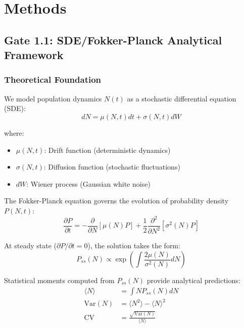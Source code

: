 \documentclass[11pt]{article}
\newcommand{\cv}{\text{CV}}
\newcommand{\var}{\text{Var}}
\begin{document}

\section{Methods}

\subsection{Gate 1.1: SDE/Fokker-Planck Analytical Framework}

\subsubsection{Theoretical Foundation}

We model population dynamics $N(t)$ as a stochastic differential equation (SDE):
\begin{equation}
dN = \mu(N,t)dt + \sigma(N,t)dW
\end{equation}

where:
\begin{itemize}
\item $\mu(N,t)$: Drift function (deterministic dynamics)
\item $\sigma(N,t)$: Diffusion function (stochastic fluctuations)
\item $dW$: Wiener process (Gaussian white noise)
\end{itemize}

The Fokker-Planck equation governs the evolution of probability density $P(N,t)$:
\begin{equation}
\frac{\partial P}{\partial t} = -\frac{\partial}{\partial N}[\mu(N)P] + \frac{1}{2}\frac{\partial^2}{\partial N^2}[\sigma^2(N)P]
\end{equation}

At steady state ($\partial P/\partial t = 0$), the solution takes the form:
\begin{equation}
P_{ss}(N) \propto \exp\left(\int \frac{2\mu(N)}{\sigma^2(N)}dN\right)
\end{equation}

Statistical moments computed from $P_{ss}(N)$ provide analytical predictions:
\begin{align}
\langle N \rangle &= \int N P_{ss}(N) dN \\
\var(N) &= \langle N^2 \rangle - \langle N \rangle^2 \\
\cv &= \frac{\sqrt{\var(N)}}{\langle N \rangle}
\end{align}
\end{document}
